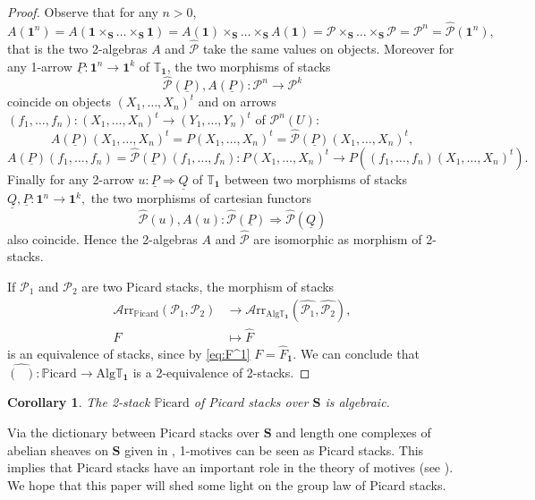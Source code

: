 \documentclass[11pt]{amsart}
\newcommand{\cA}{\mathcal{A}}
\newcommand{\cP}{\mathcal{P}}
\newcommand{\PICARD}{\mathbb{P}\mathrm{icard}}
\newcommand{\bS}{\textbf{S}}
\newcommand{\bfu}{\textbf{1}}
\newcommand{\twoT}{\mathbb{T}}
\newcommand{\Alg}{\mathrm{Alg}}
\newtheorem{corollary}[theorem]{Corollary}
\theoremstyle{definition}
\numberwithin{equation}{section}
\begin{document}
\begin{proof}
Observe that for any $n>0$, 
$$A(\bfu^n)= A(\bfu \times_\bS \dots \times_\bS \bfu )= A(\bfu) \times_\bS \dots \times_\bS A(\bfu )
= \cP \times_\bS \dots \times_\bS \cP = \cP^n = \widehat{\cP}(\bfu^n),$$
that is the two 2-algebras $A$ and $ \widehat{\cP}$ take the same values on objects.
 Moreover for any 1-arrow
$\underline{P}: \bfu^n \to \bfu^k$ of $\twoT_\bfu$, the two morphisms of stacks
$$\widehat{\cP}(\underline{P}), A(\underline{P}): \cP^n \longrightarrow  \cP^k $$ coincide on objects $(X_1, \dots, X_n)^t$ and on arrows  $(f_1, \dots, f_n): (X_1, \dots, X_n)^t \to (Y_1, \dots, Y_n)^t$ of $\cP^n(U)$:
\[ A(\underline{P}) (X_1, \dots, X_n)^t =P (X_1, \dots, X_n)^t = \widehat{\cP}(\underline{P})  (X_1, \dots, X_n)^t,  \]
\[ A(\underline{P}) (f_1, \dots, f_n) =\widehat{\cP}(\underline{P})  (f_1, \dots, f_n) : P (X_1, \dots, X_n)^t \to   P ( (f_1, \dots, f_n) (X_1, \dots, X_n)^t) .  \]
 Finally for any 2-arrow $u: \underline{P} \Rightarrow \underline{Q}$ of $\twoT_\bfu$ between two morphisms of stacks $\underline {Q}, \underline{P}: \bfu^n \to \bfu^k,$ the two morphisms of cartesian functors 
$$\widehat{\cP}(u),A(u): \widehat{\cP}(\underline{P}) \Longrightarrow \widehat{\cP}(\underline{Q} )$$ also coincide. Hence
 the 2-algebras $A$ and $\widehat{\cP} $ are isomorphic as morphism of 2-stacks.
 

If $\cP_1$ and $\cP_2$ are two Picard stacks,  the morphism of stacks 
\begin{align*}
\cA\mathrm{rr}_{\PICARD}(\cP_1,\cP_2) &\longrightarrow  \cA\mathrm{rr}_{\Alg \twoT_{\bfu}}(\widehat{\cP_1},\widehat{\cP_2}), \\
F& \longmapsto \widehat{F}
\end{align*}
 is an equivalence of stacks,
since by \eqref{eq:F^1}  $F =  \widehat{F}_{\bfu}.$
We can conclude that $ \widehat{(\; \;)}:\PICARD \rightarrow \Alg \twoT_{\bfu} $ is a 2-equivalence of 2-stacks.
\end{proof}

\begin{corollary}
	The 2-stack $\PICARD$ of Picard stacks over $\bS$ is algebraic.
\end{corollary}

 
 Via the dictionary between Picard stacks over $\bS$ and length one complexes of abelian sheaves on $\bS$ given in \cite[\S 1.4]{De},
 1-motives can be seen as Picard stacks. This implies that 
 Picard stacks have an important role in the theory of motives (see \cite{B09,B09bis,B12,B19,BeTa2,BPSS,BP,BM09,BB,BG,BG2}).
We hope that this paper will shed some light on the group law of Picard stacks. 
\end{document}
